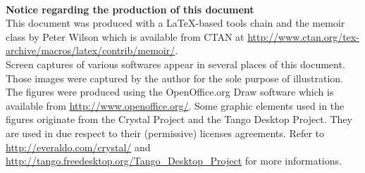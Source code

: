 
\thispagestyle{plain}

~\vfill

\begin{footnotesize}

\noindent
\textbf{Notice regarding the production of this document}\\

\noindent
This document was produced with a \LaTeX-based tools chain and the \textsf{memoir} class by Peter Wilson which is available from CTAN at \url{http://www.ctan.org/tex-archive/macros/latex/contrib/memoir/}.\\

\noindent
Screen captures of various softwares appear in several places of this document. Those images were captured by the author for the sole purpose of illustration.\\

\noindent
The figures were produced using the \textsf{OpenOffice.org Draw} software which is available from \url{http://www.openoffice.org/}. Some graphic elements used in the figures originate from the \textsf{Crystal Project} and the \textsf{Tango Desktop Project}. They are used in due respect to their (permissive) licenses agreements. Refer to \url{http://everaldo.com/crystal/} and \url{http://tango.freedesktop.org/Tango_Desktop_Project} for more informations.

\end{footnotesize}

\vfill

